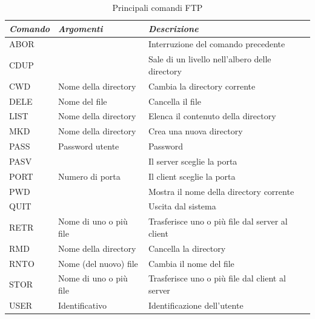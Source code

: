 \begin{table}[H]
    \centering
    \begin{tabular}{|l|l|m{16em}|}
        \hline
        \emph{Comando} & \emph{Argomenti}       & \emph{Descrizione}                              \\
        \hline
        ABOR           &                        & Interruzione del comando precedente             \\
        \hline
        CDUP           &                        & Sale di un livello nell'albero delle directory  \\
        \hline
        CWD            & Nome della directory   & Cambia la directory corrente                    \\
        \hline
        DELE           & Nome del file          & Cancella il file                                \\
        \hline
        LIST           & Nome della directory   & Elenca il contenuto della directory             \\
        \hline
        MKD            & Nome della directory   & Crea una nuova directory                        \\
        \hline
        PASS           & Password utente        & Password                                        \\
        \hline
        PASV           &                        & Il server sceglie la porta                      \\
        \hline
        PORT           & Numero di porta        & Il client sceglie la porta                      \\
        \hline
        PWD            &                        & Mostra il nome della directory corrente         \\
        \hline
        QUIT           &                        & Uscita dal sistema                              \\
        \hline
        RETR           & Nome di uno o più file & Trasferisce uno o più file dal server al client \\
        \hline
        RMD            & Nome della directory   & Cancella la directory                           \\
        \hline
        RNTO           & Nome (del nuovo) file  & Cambia il nome del file                         \\
        \hline
        STOR           & Nome di uno o più file & Trasferisce uno o più file dal client al server \\
        \hline
        USER           & Identificativo         & Identificazione dell'utente                     \\
        \hline
    \end{tabular}
    \caption*{Principali comandi FTP}
\end{table}

